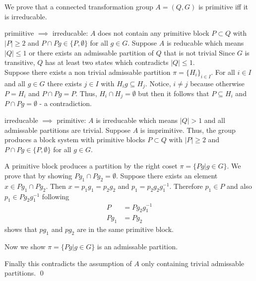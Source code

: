 \documentclass[a4paper,12pt,numbers=noenddot]{scrreport}
\begin{document}

\chapter{}
\section{}
We prove that a connected transformation group $A=(Q,G)$ is primitive iff it is irreducable.

primiitive $\implies$ irreducable: $A$ does not contain any primitive block $P \subset Q$ with $|P| \geq 2$
and $P \cap Pg \in \{P, \emptyset \}$ for all $g \in G$.
Suppose $A$ is reducable which means $|Q| \leq 1$ or there exists an admissable partition of $Q$ that is not trivial
Since $G$ is transitive, $Q$ has at least two states which contradicts $|Q| \leq 1$.\\
Suppose there exists a non trivial admissable partition $\pi = \{H_i\}_{i \in I}$.
For all $i \in I$ and all $g \in G$ there exists $j \in I$ with $H_ig \subseteq H_j$.
Notice, $i \neq j$ because otherwise $P = H_i$ and $P \cap Pg = P$.
Thus, $H_i \cap H_j = \emptyset$ but then it follows that $P \subseteq H_i$ and $P \cap Pg = \emptyset$ - a contradiction.

irreducable $\implies$ primitive: $A$ is irreducable which means $|Q| > 1$ and all admissable partitions are trivial.
Suppose $A$ is imprimitive.
Thus, the group produces a block system with primitive blocks $P \subset Q$ with $|P| \geq 2$ and $P \cap Pg \in \{P, \emptyset\}$ for all $g \in G$.

A primitive block produces a partition by the right coset  $\pi = \{Pg | g \in G\}$.
We prove that by showing $Pg_1 \cap Pg_2 = \emptyset$.
Suppose there exists an element $x \in Pg_1 \cap Pg_2$.
Then $x = p_1g_1 = p_2g_2$ and $p_1 = p_2g_2g^{-1}_1$. 
Therefore $p_1 \in P$ and also $p_1 \in Pg_2g^{-1}_1$ following 
\begin{align*}
    P &= Pg_2g^{-1}_1\\
    Pg_1 &= Pg_2
\end{align*}
shows that $pg_1$ and $pg_2$ are in the same primitive block.

Now we show $\pi = \{ Pg | g \in G\}$ is an admissable partition.

Finally this contradicts the assumption of $A$ only containing trivial admissable partitions.
\qed
\end{document}

